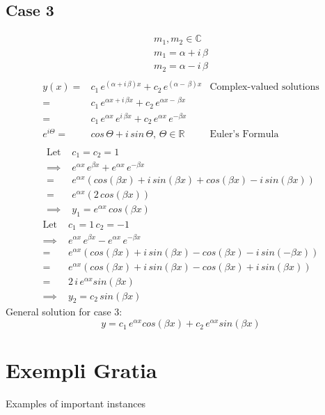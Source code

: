 \documentclass{article}
\begin{document}
	\subsection{Case 3}
		\begin{gather*}
			m_1,m_2\in\mathbb{C}\\
			m_1=\alpha+i\,\beta\\
			m_2=\alpha-i\,\beta\\
		\end{gather*}
		\begin{align*}
			y(x)=&c_1\,e^{(\alpha+i\,\beta)x}+c_2\,e^{(\alpha-\,\beta)x}&\text{Complex-valued solutions}\\
			=&c_1\,e^{\alpha x+i\,\beta x}+c_2\,e^{\alpha x-\,\beta x}&\\
			=&c_1\,e^{\alpha x}\,e^{i\,\beta x}+c_2\,e^{\alpha x}\,e^{-\beta x}&\\
			e^{i\Theta}=&cos\,\Theta+i\,sin\,\Theta,\,\Theta\in\mathbb{R}&\text{Euler's Formula}\\
		\end{align*}
		\begin{align*}
		 \text{Let }&c_1=c_2=1\\
			\implies& e^{\alpha x}\,e^{\beta x}+e^{\alpha x}\,e^{-\beta x}\\
			=&e^{\alpha x}(cos(\beta x)+i\,sin(\beta x)+cos(\beta x)-i\,sin(\beta x))\\
			=&e^{\alpha x}(2\,cos(\beta x))\\
			\implies&y_1=e^{\alpha x}\,cos(\beta x)
		\end{align*}
		\begin{align*}
			\text{Let }&c_1=1\,c_2=-1\\
			\implies& e^{\alpha x}\,e^{\beta x}-e^{\alpha x}\,e^{-\beta x}\\
			=&e^{\alpha x}(cos(\beta x)+i\,sin(\beta x)-cos(\beta x)-i\,sin(-\beta x))\\
			=&e^{\alpha x}(cos(\beta x)+i\,sin(\beta x)-cos(\beta x)+i\,sin(\beta x))\\
			=&2\,i\,e^{\alpha x}sin(\beta x)\\
			\implies&y_2=c_2\,sin(\beta x)
		\end{align*}
		General solution for case 3:
		\begin{equation*}
			y=c_1\,e^{\alpha x}cos(\beta x)+c_2\,e^{\alpha x}sin(\beta x)
		\end{equation*}

\section{Exempli Gratia}

Examples of important instances
\end{document}
